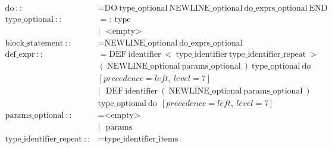 \documentclass[a4paper,12pt]{book} %
\begin{document}
\begin{align*}
  \text{do}\ ::                       & = \text{DO}\ \text{type\_optional}\ \text{NEWLINE\_optional}\ \text{do\_exprs\_optional}\ \text{END}                                                                                                                      \\
  \text{type\_optional}\ ::           & = :\ \text{type}                                                                                                                                                                                                          \\
                                      & |\ \ \ \text{<empty>}                                                                                                                                                                                                     \\
  \text{block\_statement}\ ::         & = \text{NEWLINE\_optional}\ \text{do\_exprs\_optional}                                                                                                                                                                    \\
  \text{def\_expr}\ ::                & = \text{DEF}\ \text{identifier}\ <\ \text{type\_identifier}\ \text{type\_identifier\_repeat}\ > \\ & (\ \text{NEWLINE\_optional}\ \text{params\_optional}\ )\ \text{type\_optional}\ \text{do} \\ & [precedence=left,\ level=7] \\
                                      & |\ \ \ \text{DEF}\ \text{identifier}\ (\ \text{NEWLINE\_optional}\ \text{params\_optional}\ ) \\ & \text{type\_optional}\ \text{do}\ \ [precedence=left,\ level=7]                                                            \\
  \text{params\_optional}\ ::         & = \text{<empty>}                                                                                                                                                                                                          \\
                                      & |\ \ \ \text{params}                                                                                                                                                                                                      \\
  \text{type\_identifier\_repeat}\ :: & = \text{type\_identifier\_items}                                                                                                                                                                                          \\

\end{align*}
\end{document}
